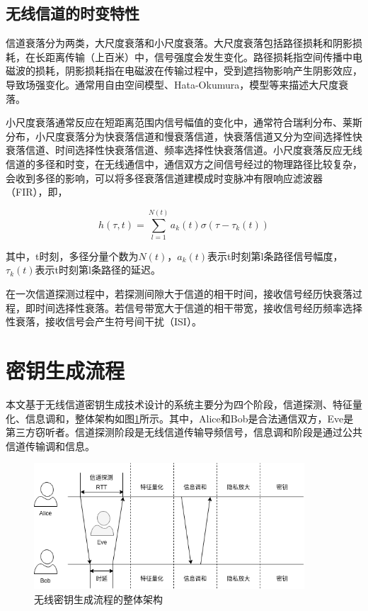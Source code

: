 \documentclass[master]{seuthesis} %
\begin{document}
\begin{Main}
\subsection{无线信道的时变特性}


信道衰落分为两类，大尺度衰落和小尺度衰落。大尺度衰落包括路径损耗和阴影损耗，在长距离传输（上百米）中，信号强度会发生变化。路径损耗指空间传播中电磁波的损耗，阴影损耗指在电磁波在传输过程中，受到遮挡物影响产生阴影效应，导致场强变化。通常用自由空间模型、Hata-Okumura，模型等来描述大尺度衰落。

小尺度衰落通常反应在短距离范围内信号幅值的变化中，通常符合瑞利分布、莱斯分布，小尺度衰落分为快衰落信道和慢衰落信道，快衰落信道又分为空间选择性快衰落信道、时间选择性快衰落信道、频率选择性快衰落信道。小尺度衰落反应无线信道的多径和时变，在无线通信中，通信双方之间信号经过的物理路径比较复杂，会收到多径的影响，可以将多径衰落信道建模成时变脉冲有限响应滤波器（FIR），即，

\begin{equation}
    h(\tau, t) = \sum_{l = 1}^{N(t)} a_k(t) \sigma(\tau - \tau_k(t))
\end{equation}

其中，t时刻，多径分量个数为$N(t)$，$a_k(t)$表示t时刻第l条路径信号幅度，$\tau_k(t)$表示t时刻第l条路径的延迟。

在一次信道探测过程中，若探测间隙大于信道的相干时间，接收信号经历快衰落过程，即时间选择性衰落。若信号带宽大于信道的相干带宽，接收信号经历频率选择性衰落，接收信号会产生符号间干扰（ISI）。


\section{密钥生成流程}

本文基于无线信道密钥生成技术设计的系统主要分为四个阶段，信道探测、特征量化、信息调和，整体架构如图\ref{whole_structure}所示。其中，Alice和Bob是合法通信双方，Eve是第三方窃听者。信道探测阶段是无线信道传输导频信号，信息调和阶段是通过公共信道传输调和信息。

\begin{figure}[htbp!]
    \centering \includegraphics[width=0.9\textwidth]{images/whole_structure} 
    \caption{无线密钥生成流程的整体架构}
    \label{whole_structure}
\end{figure}


\end{Main}
\end{document}
